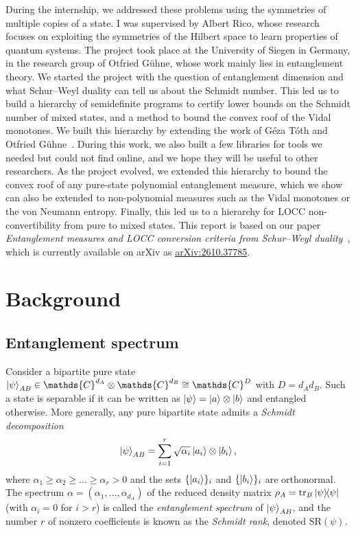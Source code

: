 \documentclass[11pt,a4paper]{report}
\renewcommand{\a}{\alpha}
\newcommand{\C}{\mathds{C}}
\begin{document}
During the internship, we addressed these problems using the symmetries of multiple copies of a state. I was supervised by Albert Rico, whose research focuses on exploiting the symmetries of the Hilbert space to learn properties of quantum systems. The project took place at the University of Siegen in Germany, in the research group of Otfried G\"uhne, whose work mainly lies in entanglement theory.
We started the project with the question of entanglement dimension and what Schur--Weyl duality can tell us about the Schmidt number. This led us to build a hierarchy of semidefinite programs to certify lower bounds on the Schmidt number of mixed states, and a method to bound the convex roof of the Vidal monotones. We built this hierarchy by extending the work of G\'eza T\'oth and Otfried G\"uhne~\cite{Toth2015CroofTP}.
During this work, we also built a few libraries for tools we needed but could not find online, and we hope they will be useful to other researchers.
As the project evolved, we extended this hierarchy to bound the convex roof of any pure-state polynomial entanglement measure, which we show can also be extended to non-polynomial measures such as the Vidal monotones or the von Neumann entropy.
Finally, this led us to a hierarchy for LOCC non-convertibility from pure to mixed states. This report is based on our paper \emph{Entanglement measures and LOCC conversion criteria from Schur--Weyl duality}~\cite{ourPaper}, which is currently available on arXiv as \href{https://arxiv.org/abs/2610.37785}{arXiv:2610.37785}.


\chapter{Background}\label{ch:background}

\section{Entanglement spectrum}\label{ch:spectrum}
Consider a bipartite pure state $\ket{\psi}_{AB} \in \C^{d_A} \otimes \C^{d_B} \cong \C^D$ with $D = d_Ad_B$. Such a state is separable if it can be written as $\ket{\psi}=\ket{a}\otimes\ket{b}$ and entangled otherwise. More generally, any pure bipartite state admits a \emph{Schmidt decomposition}
\begin{equation}\label{eq:SchmidtDec}
    \ket{\psi}_{AB} = \sum_{i=1}^r \sqrt{\a_i}\ket{a_i}\otimes\ket{b_i},
\end{equation}
where $\a_1\geq\a_2\geq\dots\geq\a_r>0$ and the sets $\{\ket{a_i}\}_i$ and $\{\ket{b_i}\}_i$ are orthonormal. The spectrum $\a=(\a_1,\dots,\a_{d_A})$ of the reduced density matrix $\rho_A=\tr_B\dyad{\psi}$ (with $\a_i=0$ for $i>r$) is called the {\em entanglement spectrum} of $\ket{\psi}_{AB}$, and the number $r$ of nonzero coefficients is known as the {\em Schmidt rank}, denoted $\mathrm{SR}(\psi)$.
\end{document}
